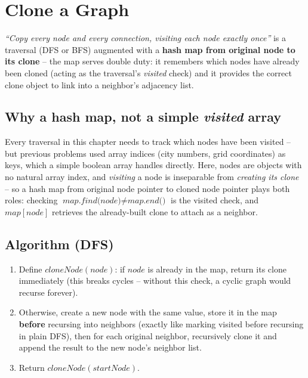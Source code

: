\section{Clone a Graph}
\label{sec:graph-clone-graph}


\begin{patternbox}
\emph{``Copy every node and every connection, visiting each node
exactly once''} is a traversal (DFS or BFS) augmented with a
\textbf{hash map from original node to its clone} -- the map serves
double duty: it remembers which nodes have already been cloned (acting
as the traversal's \textit{visited} check) and it provides the correct
clone object to link into a neighbor's adjacency list.
\end{patternbox}

\subsection*{Why a hash map, not a simple \textit{visited} array}

Every traversal in this chapter needs to track which nodes have been
visited -- but previous problems used array indices (city numbers,
grid coordinates) as keys, which a simple boolean array handles
directly. Here, nodes are objects with no natural array index, and
\emph{visiting} a node is inseparable from \emph{creating its clone} --
so a hash map from original node pointer to cloned node pointer plays
both roles: checking $\textit{map.find(node)} \neq \textit{map.end()}$
is the visited check, and $\textit{map}[\textit{node}]$ retrieves the
already-built clone to attach as a neighbor.

\subsection*{Algorithm (DFS)}

\begin{enumerate}
  \item Define $\textit{cloneNode}(\textit{node})$: if $\textit{node}$
        is already in the map, return its clone immediately (this
        breaks cycles -- without this check, a cyclic graph would
        recurse forever).
  \item Otherwise, create a new node with the same value, store it in
        the map \textbf{before} recursing into neighbors (exactly like
        marking visited before recursing in plain DFS), then for each
        original neighbor, recursively clone it and append the result
        to the new node's neighbor list.
  \item Return $\textit{cloneNode}(\textit{startNode})$.
\end{enumerate}

